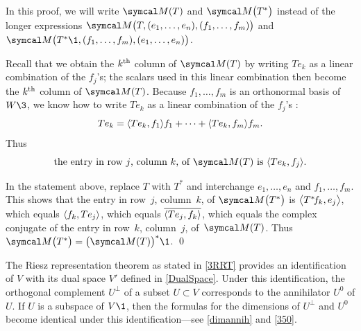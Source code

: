 { %


\proof
In this proof, we will write $\M(T)$ and $\M\paren[\big]{T^*}$ instead of the longer expressions $\M\bigl(T, (e_1, \dots, e_n), (f_1, \dots, f_m)\bigr)$ and $\M\bigl(T^*\1, (f_1, \dots, f_m), (e_1, \dots, e_n)\bigr)$.

Recall that we obtain the $k^\nth$ column of $\M(T)$ by writing $Te_k$  as a linear combination of the $f_j$'s; the scalars used in this linear  combination then become the $k^\nth$ column of $\M(T)$.  Because $f_1, \dots, f_m$ is an  orthonormal basis of $W\3$, we know how to write $Te_k$ as a linear combination  of the $f_j$'s :
\[
Te_k = \ip{Te_k, f_1} f_1 + \dots + \ip{Te_k, f_m} f_m.
\]
Thus
\[
\mbox{the entry in row~$j$, column~$k$, of $\M(T)$ is $\ip{Te_k, f_j}$}.
\]

 In the statement above, replace $T$ with $T^*$ and interchange $e_1, \dots, e_n$ and $f_1, \dots, f_m$. This shows that the entry in row~$j$, column~$k$, of $\M\paren[\big]{T^*}$
is $\ip[\big]{T^* \! f_k, e_j}$, which equals $\ip{f_k, Te_j}$, which equals
$\overline{\ip{Te_j, f_k}}$, which equals the complex conjugate of the entry in
row~$k$, column~$j$, of~$\M(T)$. Thus $\M\paren[\big]{T^*} = \paren[\big]{ \M(T) }^*\1$.
\qed

} %

The Riesz representation theorem as stated in \ref{3RRT} provides an identification of $V$ with its dual space $V'$ defined in \ref{DualSpace}. Under this identification, the orthogonal complement $U^\perp$ of a subset $U \subset V$ corresponds to the annihilator $U^0$ of $U$. If $U$ is a subspace of $V\1$, then the formulas for the dimensions of $U^\perp$ and $U^0$ become identical under this identification---see \ref{dimannih} and \ref{350}.


